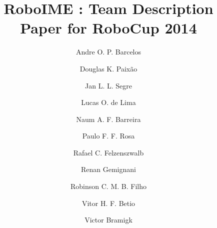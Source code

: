 \documentclass[brazil,english]{llncs}
\begin{document}
\title{RoboIME : Team Description Paper for RoboCup 2014}
\author{
 Andre O. P. Barcelos \and
 Douglas K. Paixão \and
 Jan L. L. Segre \and
 Lucas O. de Lima \and
 Naum A. F. Barreira \and
 Paulo F. F. Rosa \and
 Rafael C. Felzenszwalb \and
 Renan Gemignani \and
 Robinson C. M. B. Filho \and
 Vitor H. F. Betio \and
 Victor Bramigk
}

\maketitle
%









\end{document}
